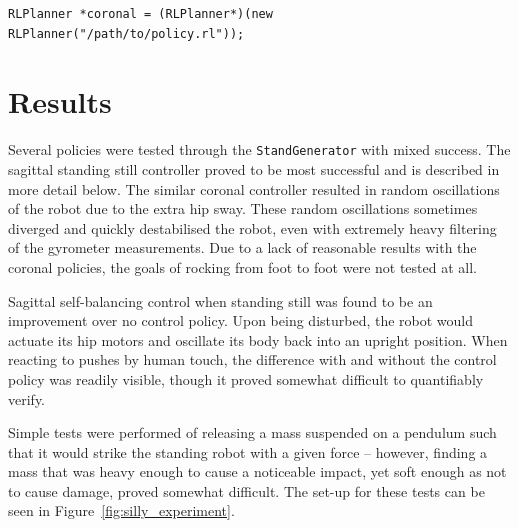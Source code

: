 \begin{lstlisting}
RLPlanner *coronal = (RLPlanner*)(new RLPlanner("/path/to/policy.rl"));
\end{lstlisting}

\newpage
\section{Results}
\label{sec:rl_results}
Several policies were tested through the \texttt{StandGenerator} with mixed success. The sagittal standing still controller proved to be most successful and is described in more detail below. The similar coronal controller resulted in random oscillations of the robot due to the extra hip sway. These random oscillations sometimes diverged and quickly destabilised the robot, even with extremely heavy filtering of the gyrometer measurements. Due to a lack of reasonable results with the coronal policies, the goals of rocking from foot to foot were not tested at all.

Sagittal self-balancing control when standing still was found to be an improvement over no control policy. Upon being disturbed, the robot would actuate its hip motors and oscillate its body back into an upright position. When reacting to pushes by human touch, the difference with and without the control policy was readily visible, though it proved somewhat difficult to quantifiably verify. 

Simple tests were performed of releasing a mass suspended on a pendulum such that it would strike the standing robot with a given force -- however, finding a mass that was heavy enough to cause a noticeable impact, yet soft enough as not to cause damage, proved somewhat difficult. The set-up for these tests can be seen in Figure~\ref{fig:silly_experiment}.

